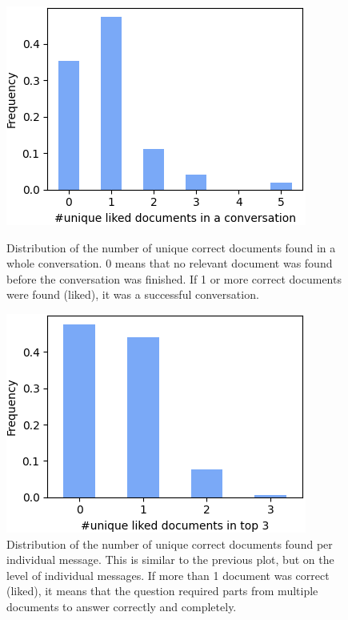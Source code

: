 \begin{figure}[H]
\centering
\begin{minipage}{0.48\linewidth}
    \centerline{\includegraphics[width=\linewidth]{fig/RAG_nr_correct_in_conversation.png}}
    \caption{Distribution of the number of unique correct documents found in a whole conversation. 0 means that no relevant document was found before the conversation was finished. If 1 or more correct documents were found (liked), it was a successful conversation.}
    \label{fig:liked_docs_per_convo}
\end{minipage}
\hfill
\begin{minipage}{0.48\linewidth}
    \vspace{12pt}
    \centerline{\includegraphics[width=\linewidth]{fig/RAG_nr_top_3.png}}
    \caption{Distribution of the number of unique correct documents found per individual message. This is similar to the previous plot, but on the level of individual messages. If more than 1 document was correct (liked), it means that the question required parts from multiple documents to answer correctly and completely.}
    \label{fig:liked_docs}
\end{minipage}
\end{figure}

